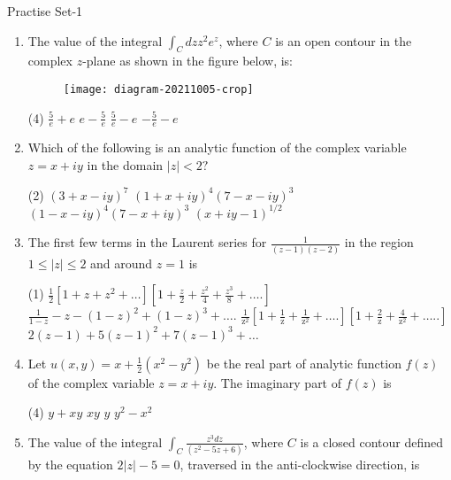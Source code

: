 \newpage
\begin{abox}
	Practise Set-1
	\end{abox}
\begin{enumerate}[label=\color{ocre}\textbf{\arabic*.}]
	\item The value of the integral $\int_{C} d z z^{2} e^{z}$, where $C$ is an open contour in the complex $z$-plane as shown in the figure below, is:
	{}
	\begin{figure}[H]
		\centering
		\texttt{[image: diagram-20211005-crop]}
	\end{figure}
	\begin{tasks}(4)
		\task[\textbf{A.}] $\frac{5}{e}+e$
		\task[\textbf{B.}] $e-\frac{5}{e}$
		\task[\textbf{C.}] $\frac{5}{e}-e$
		\task[\textbf{D.}] $-\frac{5}{e}-e$
	\end{tasks}
	\item Which of the following is an analytic function of the complex variable $z=x+i y$ in the domain $|z|<2 ?$
	{}
	\begin{tasks}(2)
		\task[\textbf{A.}] $(3+x-i y)^{7}$
		\task[\textbf{B.}] $(1+x+i y)^{4}(7-x-i y)^{3}$
		\task[\textbf{C.}] $(1-x-i y)^{4}(7-x+i y)^{3}$
		\task[\textbf{D.}] $(x+i y-1)^{1 / 2}$
	\end{tasks}
	\item The first few terms in the Laurent series for $\frac{1}{(z-1)(z-2)}$ in the region $1 \leq|z| \leq 2$ and around $z=1$ is
	{}
	\begin{tasks}(1)
		\task[\textbf{A.}] $\frac{1}{2}\left[1+z+z^{2}+\ldots\right]\left[1+\frac{z}{2}+\frac{z^{2}}{4}+\frac{z^{3}}{8}+\ldots .\right]$
		\task[\textbf{B.}] $\frac{1}{1-z}-z-(1-z)^{2}+(1-z)^{3}+\ldots .$
		\task[\textbf{C.}] $\frac{1}{\mathrm{z}^{2}}\left[1+\frac{1}{\mathrm{z}}+\frac{1}{\mathrm{z}^{2}}+\ldots .\right]\left[1+\frac{2}{\mathrm{z}}+\frac{4}{\mathrm{z}^{2}}+\ldots . .\right]$
		\task[\textbf{D.}]  $2(z-1)+5(z-1)^{2}+7(z-1)^{3}+\ldots$
	\end{tasks}
	\item Let $u(x, y)=x+\frac{1}{2}\left(x^{2}-y^{2}\right)$ be the real part of analytic function $f(z)$ of the complex variable $z=x+i y$. The imaginary part of $f(z)$ is
	{}
	\begin{tasks}(4)
		\task[\textbf{A.}] $y+x y$
		\task[\textbf{B.}] $x y$
		\task[\textbf{C.}] $y$
		\task[\textbf{D.}] $y^{2}-x^{2}$
	\end{tasks}
	\item The value of the integral $\int_{C} \frac{z^{3} d z}{\left(z^{2}-5 z+6\right)}$, where $C$ is a closed contour defined by the equation $2|z|-5=0$, traversed in the anti-clockwise direction, is

\end{enumerate}

